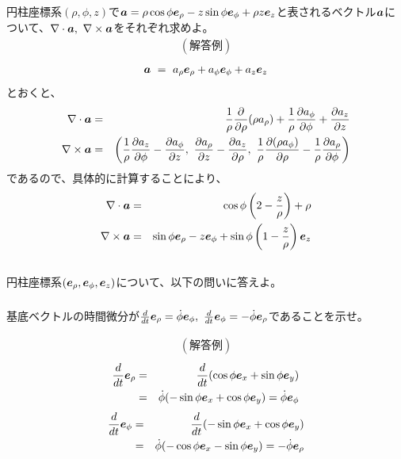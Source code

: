 \documentclass[a4paper,11pt,fleqn]{jarticle}
\def \vec#1{\mbox{\boldmath $#1$}} %
\def \rot{\nabla \times} %
\def \div{\nabla \cdot} %
\begin{document}
\subsection{}
円柱座標系$(\rho ,\phi ,z)$で$\vec{a}=\rho\cos\phi\vec{e}_{\rho}-z\sin\phi\vec{e}_{\phi}+\rho z\vec{e}_z$と表されるベクトル$\vec{a}$について、$\nabla\cdot\vec{a},~\nabla\times\vec{a}$をそれぞれ求めよ。
\begin{eqnarray*}
(解答例)
\end{eqnarray*}
\begin{eqnarray*}
\vec{a} ~=~ a_{\rho}\vec{e}_{\rho}+a_{\phi}\vec{e}_\phi +a_z\vec{e}_z
\end{eqnarray*}
とおくと、
\begin{eqnarray*}
\div\vec{a} &=& \frac{1}{\rho}\frac{\partial}{\partial \rho}(\rho a_{\rho})+\frac{1}{\rho}\frac{\partial a_{\phi}}{\partial \phi}+\frac{\partial a_z}{\partial z}\\
\rot\vec{a} &=& \left(\frac{1}{\rho}\frac{\partial a_z}{\partial \phi}-\frac{\partial a_{\phi}}{\partial z},~\frac{\partial a_{\rho}}{\partial z}-\frac{\partial a_z}{\partial \rho},~\frac{1}{\rho}\frac{\partial (\rho a_{\phi})}{\partial \rho}-\frac{1}{\rho}\frac{\partial a_{\rho}}{\partial \phi}\right)
\end{eqnarray*}
であるので、具体的に計算することにより、
\begin{eqnarray*}
\div\vec{a} &=& \cos\phi\left(2-\frac{z}{\rho}\right)+\rho \\
\rot\vec{a} &=& \sin\phi\vec{e}_{\rho}-z\vec{e}_{\phi}+\sin\phi\left(1-\frac{z}{\rho}\right)\vec{e}_z
\end{eqnarray*}

\newpage
\subsection{}
円柱座標系$(\vec{e}_{\rho},\vec{e}_{\phi},\vec{e}_z)$について、以下の問いに答えよ。
\subsubsection{}
基底ベクトルの時間微分が$\frac{d}{d t}\vec{e}_{\rho}=\dot{\phi}\vec{e}_{\phi},~\frac{d}{d t}\vec{e}_{\phi}=-\dot{\phi}\vec{e}_{\rho}$であることを示せ。

\begin{eqnarray*}
(解答例)
\end{eqnarray*}
\begin{eqnarray*}
\frac{d}{dt}\vec{e}_\rho&=&\frac{d}{dt}(\cos\phi\vec{e}_x+\sin\phi\vec{e}_y)\\
&=&\dot{\phi}(-\sin\phi\vec{e}_x+\cos\phi\vec{e}_y)=\dot{\phi}\vec{e}_\phi
\end{eqnarray*}
\begin{eqnarray*}
\frac{d}{dt}\vec{e}_\phi&=&\frac{d}{dt}(-\sin\phi\vec{e}_x+\cos\phi\vec{e}_y)\\
&=&\dot{\phi}(-\cos\phi\vec{e}_x-\sin\phi\vec{e}_y)=-\dot{\phi}\vec{e}_\rho
\end{eqnarray*}
\end{document}
